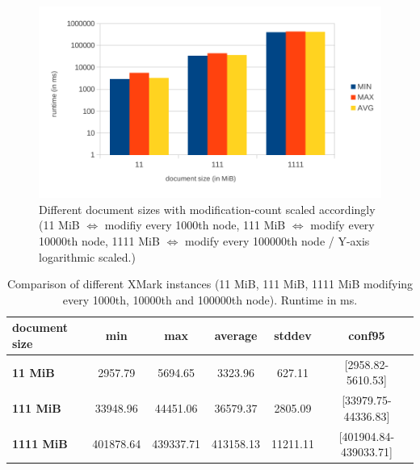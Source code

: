 \begin{figure}[tb]
\centering
\includegraphics[width=\textwidth]{figures/diff-docsize-scale}
\caption{Different document sizes with modification-count scaled accordingly (11 MiB $\Leftrightarrow$ modifiy every 1000th node, 111 MiB $\Leftrightarrow$ modify every 10000th node, 1111 MiB $\Leftrightarrow$ modify every 100000th node / Y-axis logarithmic scaled.)} 
\label{fig:docScaling}
\end{figure}

\begin{table}[tb]
\centering 
\begin{tabular}[r]{|l|c|c|c|c|c|} 
\hline
\textbf{document size} & \textbf{min} & \textbf{max} & \textbf{average} & \textbf{stddev} & \textbf{conf95}\\
\hline
\hline
\textbf{11 MiB} & 2957.79 & 5694.65 & 3323.96 & 627.11 & [2958.82-5610.53]\\
\hline
\textbf{111 MiB} & 33948.96 & 44451.06 & 36579.37 & 2805.09 & [33979.75-44336.83]\\
\hline
\textbf{1111 MiB} & 401878.64 & 439337.71 & 413158.13 & 11211.11 & [401904.84-439033.71]\\
\hline
\end{tabular}
\label{chap3:compDiffInstances}
\vspace{0.5em} 
\caption{Comparison of different XMark instances (11 MiB, 111 MiB, 1111 MiB modifying every 1000th, 10000th and 100000th node). Runtime in ms.}
\end{table}


